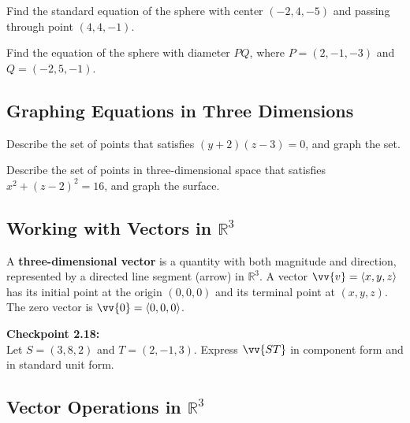 \documentclass{article}
\begin{document}
\begin{exercisebox}
    Find the standard equation of the sphere with center \((-2, 4, -5)\) and passing through point \((4, 4, -1)\).
\end{exercisebox}

\begin{exercisebox}
    Find the equation of the sphere with diameter \(PQ\), where \(P = (2, -1, -3)\) and \(Q = (-2, 5, -1)\).
\end{exercisebox}

\subsection*{Graphing Equations in Three Dimensions}

\begin{exercisebox}
    Describe the set of points that satisfies \((y + 2)(z - 3) = 0\), and graph the set.
\end{exercisebox}

\begin{exercisebox}
    Describe the set of points in three-dimensional space that satisfies \(x^2 + (z - 2)^2 = 16\), and graph the surface.
\end{exercisebox}

\subsection*{Working with Vectors in \(\mathbb{R}^3\)}

\begin{definitionbox}
    A \textbf{three-dimensional vector} is a quantity with both magnitude and direction, represented by a directed line segment (arrow) in \(\mathbb{R}^3\). A vector \(\vv{v} = \langle x, y, z \rangle\) has its initial point at the origin \((0, 0, 0)\) and its terminal point at \((x, y, z)\). The zero vector is \(\vv{0} = \langle 0, 0, 0 \rangle\).
\end{definitionbox}

\begin{exercisebox}
    \textbf{Checkpoint 2.18:} \\
    Let \(S = (3, 8, 2)\) and \(T = (2, -1, 3)\). Express \(\vv{ST}\) in component form and in standard unit form.
\end{exercisebox}

\subsection*{Vector Operations in \(\mathbb{R}^3\)}
\end{document}
